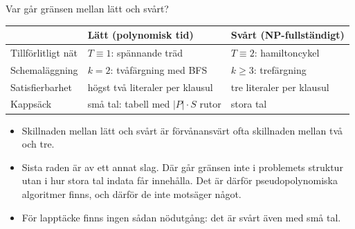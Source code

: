 \documentclass[aspectratio=169,10pt]{beamer}
\begin{document}
\begin{frame}{Var går gränsen mellan lätt och svårt?}
  \centering
  \begin{tabular}{@{}L{3.2cm}L{4.9cm}L{4.9cm}@{}}
    \toprule
     & \textbf{Lätt} (polynomisk tid) & \textbf{Svårt} (NP-fullständigt) \\
    \midrule
    Tillförlitligt nät & $T\equiv1$: spännande träd & $T\equiv2$: hamiltoncykel \\[1mm]
    Schemaläggning & $k=2$: tvåfärgning med BFS & $k\ge3$: trefärgning \\[1mm]
    Satisfierbarhet & högst två literaler per klausul & tre literaler per klausul \\[1mm]
    Kappsäck & små tal: tabell med $|P|\cdot S$ rutor & stora tal \\
    \bottomrule
  \end{tabular}
  \vspace{3mm}
  \begin{itemize}
    \item<2-> Skillnaden mellan lätt och svårt är förvånansvärt ofta skillnaden mellan två och tre.
    \item<3-> Sista raden är av ett annat slag. Där går gränsen inte i problemets struktur utan i hur stora tal indata får innehålla. Det är därför pseudopolynomiska algoritmer finns, och därför de inte motsäger något.
    \item<4-> För lapptäcke finns ingen sådan nödutgång: det är svårt även med små tal.
  \end{itemize}
\end{frame}
\end{document}
